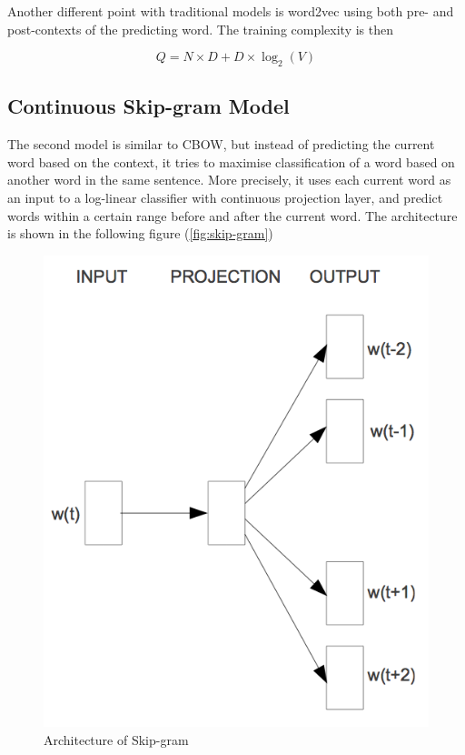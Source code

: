 \documentclass[]{article}
\begin{document}
Another different point with traditional models is word2vec using both
pre- and post-contexts of the predicting word. The training complexity
is then

\[
Q = N \times D + D \times \log_2(V)
\]

\subsection{Continuous Skip-gram
Model}\label{continuous-skip-gram-model}

The second model is similar to CBOW, but instead of predicting the
current word based on the context, it tries to maximise classification
of a word based on another word in the same sentence. More precisely, it
uses each current word as an input to a log-linear classifier with
continuous projection layer, and predict words within a certain range
before and after the current word. The architecture is shown in the
following figure (\autoref{fig:skip-gram})

\begin{figure}[h]\centering\includegraphics[width=\textwidth]{source//images/posts/skip-gram.png}\caption{Architecture of Skip-gram}\label{fig:skip-gram}\end{figure}
\end{document}
